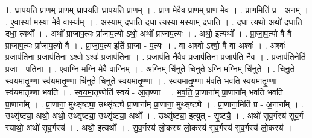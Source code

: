 \documentclass[17pt]{extarticle}
\begin{document}
1. घ्रा॒प॒य॒ति॒ प्रा॒णम् प्रा॒णम् घ्रा॑पयति घ्रापयति प्रा॒णम् । . प्रा॒ण मे॒वैव प्रा॒णम् प्रा॒ण मे॒व । . प्रा॒णमिति॑ प्र - अ॒नम् । . ए॒वास्या॑ मस्या मे॒वै वास्या᳚म् । . अ॒स्या॒म् द॒धा॒ति॒ द॒धा॒ त्य॒स्या॒ म॒स्या॒म् द॒धा॒ति॒ । . द॒धा॒ त्यथो॒ अथो॑ दधाति दधा॒ त्यथो᳚ । . अथो᳚ प्राजाप॒त्यः प्रा॑जाप॒त्यो ऽथो॒ अथो᳚ प्राजाप॒त्यः । . अथो॒ इत्यथो᳚ । . प्रा॒जा॒प॒त्यो वै वै प्रा॑जाप॒त्यः प्रा॑जाप॒त्यो वै । . प्रा॒जा॒प॒त्य इति॑ प्राजा - प॒त्यः । . वा अश्वो ऽश्वो॒ वै वा अश्वः॑ । . अश्वः॑ प्र॒जाप॑तिना प्र॒जाप॑ति॒ना ऽश्वो ऽश्वः॑ प्र॒जाप॑तिना । . प्र॒जाप॑ति नै॒वैव प्र॒जाप॑तिना प्र॒जाप॑ति नै॒व । . प्र॒जाप॑ति॒नेति॑ प्र॒जा - प॒ति॒ना॒ । . ए॒वाग्नि म॒ग्नि मे॒वै वाग्निम् । . अ॒ग्निम् चि॑नुते चिनुते॒ ऽग्नि म॒ग्निम् चि॑नुते । . चि॒नु॒ते॒ स्व॒य॒मा॒तृ॒ण्णा स्व॑यमातृ॒ण्णा चि॑नुते चिनुते स्वयमातृ॒ण्णा । . स्व॒य॒मा॒तृ॒ण्णा भ॑वति भवति स्वयमातृ॒ण्णा स्व॑यमातृ॒ण्णा भ॑वति । . स्व॒य॒मा॒तृ॒ण्णेति॑ स्वयं - आ॒तृ॒ण्णा । . भ॒व॒ति॒ प्रा॒णाना᳚म् प्रा॒णाना᳚म् भवति भवति प्रा॒णाना᳚म् । . प्रा॒णाना॒ मुथ्सृ॑ष्ट्या॒ उथ्सृ॑ष्ट्यै प्रा॒णाना᳚म् प्रा॒णाना॒ मुथ्सृ॑ष्ट्यै । . प्रा॒णाना॒मिति॑ प्र - अ॒नाना᳚म् । . उथ्सृ॑ष्ट्या॒ अथो॒ अथो॒ उथ्सृ॑ष्ट्या॒ उथ्सृ॑ष्ट्या॒ अथो᳚ । . उथ्सृ॑ष्ट्या॒ इत्युत् - सृ॒ष्ट्यै॒ । . अथो॑ सुव॒र्गस्य॑ सुव॒र्ग स्याथो॒ अथो॑ सुव॒र्गस्य॑ । . अथो॒ इत्यथो᳚ । . सु॒व॒र्गस्य॑ लो॒कस्य॑ लो॒कस्य॑ सुव॒र्गस्य॑ सुव॒र्गस्य॑ लो॒कस्य॑ । \newline
\end{document}

